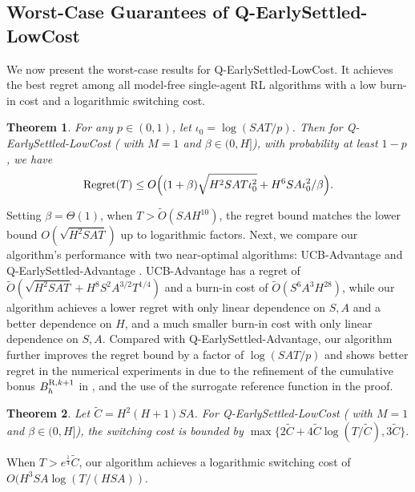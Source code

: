 \documentclass{article}
\newtheorem{theorem}{Theorem}[section]
\newcommand{\R}{\textnormal{R}}
\begin{document}
\subsection{Worst-Case Guarantees of Q-EarlySettled-LowCost}
We now present the worst-case results for Q-EarlySettled-LowCost. It achieves the best regret among all model-free single-agent RL algorithms with a low burn-in cost and a logarithmic switching cost.
\begin{theorem}
\label{thm_regret} 
For any $p \in (0,1)$, let $\iota_0 = \log(SAT/p)$. Then for Q-EarlySettled-LowCost ( with $M=1$ and $\beta \in (0,H]$), with probability at least $1-p$, we have
\begin{equation*}
    \textnormal{Regret}(T) \leq O\Big((1+\beta) \sqrt{H^2SAT\iota_0^2} + H^6SA\iota_0^2/\beta\Big).
\end{equation*}
\end{theorem}
Setting $\beta = \Theta(1)$, when $T > \tilde{O}(SAH^{10})$, the regret bound matches the lower bound $O(\sqrt{H^2 S A T})$ up to logarithmic factors. Next, we compare our algorithm's performance with two near-optimal algorithms: UCB-Advantage \cite{zhang2020almost} and Q-EarlySettled-Advantage \cite{li2023breaking}. UCB-Advantage has a regret of $\tilde{O}(\sqrt{H^2 S A T} + H^8 S^2 A^{3/2} T^{1/4})$ and a burn-in cost of $\tilde{O}(S^6 A^3 H^{28})$, while our algorithm achieves a lower regret with only linear dependence on $S, A$ and a better dependence on $H$, and a much smaller burn-in cost with only linear dependence on $S,A$. Compared with Q-EarlySettled-Advantage, our algorithm further improves the regret bound by a factor of $\log(SAT/p)$ and shows better regret in the numerical experiments in  due to the refinement of the cumulative bonus $B_{h}^{\R,k+1}$ in , and the use of the surrogate reference function in the proof.
\begin{theorem}
\label{thm_wccost} 
Let $\tilde{C} = H^2(H+1)SA$. For Q-EarlySettled-LowCost ( with $M=1$ and $\beta \in (0,H]$), the switching cost is bounded by $\max\{2\tilde{C}+ 4\tilde{C}\log(T/\tilde{C}), 3\tilde{C}\}.$
\end{theorem}
When $T > e^{\frac{1}{4}}\tilde{C}$, our algorithm achieves a logarithmic switching cost of $O(H^3SA\log (T/(HSA))$.
\end{document}
